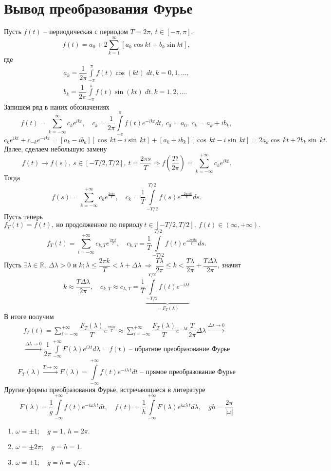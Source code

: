 \section{Вывод преобразования Фурье}
Пусть $f(t)$ -- периодическая с периодом $T=2\pi,\: t\in[-\pi,\pi]$.
$$
f(t)=a_0+2\sum\limits_{k=1}^{\infty}\left[a_k \cos kt + b_k \sin kt\right],
$$
где 
$$
\begin{array}{ll}
a_k=\dfrac{1}{2\pi}\int\limits_{-\pi}^{\pi}f(t)\cos(kt)\;dt, k=0,1,\dots, \\
b_k=\dfrac{1}{2\pi}\int\limits_{-\pi}^{\pi}f(t)\sin(kt)\;dt, k=1,2,\dots.
\end{array}
$$
Запишем ряд в наних обозначениях
$$
f(t)=\sum\limits_{k=-\infty}^{\infty}c_ke^{ikt},\quad c_k=\dfrac{1}{2\pi}\int\limits_{-\pi}^{\pi}f(t)e^{-ikt}dt,\: c_0=a_0,\: c_k=a_k+ib_k,
$$
$$
c_k e^{ikt} + c_{-k} e^{-ikt}=[a_k-ib_k][\cos\,kt + i\sin\,kt] + [a_k+ib_k][\cos\,kt-i\sin\,kt]=2a_k\cos\,kt+2b_k\sin\,kt.
$$
Далее, сделаем небольшую замену
$$
f(t)\longrightarrow f(s),\ s\in[-T/2,T/2],\ t=\dfrac{2\pi s}{T}\Rightarrow f\left(\dfrac{Tt}{2\pi}\right)=\sum\limits_{k=-\infty}^{+\infty}c_k e^{ikt}.
$$
Тогда 
$$
f(s)=\sum\limits_{k=-\infty}^{+\infty}c_k e^{\frac{2\pi is}{T}},\quad c_k=\dfrac{1}{T}\int\limits_{-T/2}^{T/2}f(s)e^{\frac{-2\pi isk}{T}}ds.
$$
Пусть теперь
$$
f_T(t)=f(t),\ \text{но продолженное по периоду}\ t\in\left[-T/2,T/2\right],\ f(t)\in (\infty,+\infty).
$$
$$
f_T(t)=\sum\limits_{i=-\infty}^{+\infty}c_{k,T} e^{\frac{2\pi it}{T}},\quad c_{k,T}=\dfrac{1}{T}\int\limits_{-T/2}^{T/2}f(t)e^{\frac{-2\pi itk}{T}}ds.
$$
Пусть $\exists\lambda\in\mathbb{R},\ \Delta\lambda > 0$  и $k:\lambda\leqslant \dfrac{2\pi k}{T}<\lambda+\Delta\lambda\:\Rightarrow\:\dfrac{T\lambda}{2\pi}\leq k < \dfrac{T\lambda}{2\pi}+\dfrac{T\Delta\lambda}{2\pi}$,  значит 
$$
k\approx \dfrac{T\Delta\lambda}{2\pi},\quad c_{k,T}\approx c_{\lambda,T}=\dfrac{1}{T}\underbrace{\int\limits_{-T/2}^{T/2}f(t)e^{-i\lambda t}}_{=F_T(\lambda)}
$$
В итоге получим
\begin{multline*}
f_T(t)=\sum\limits_{i=-\infty}^{+\infty}\dfrac{F_T(\lambda)}{T}e^{\frac{2\pi ikt}{T}}
\approx\sum\limits_{i=-\infty}^{+\infty}\dfrac{F_T(\lambda)}{T}e^{-\lambda t}\dfrac{T}{2\pi}\Delta\lambda
\xrightarrow{\Delta\lambda\to 0}\\
\xrightarrow{\Delta\lambda\to 0}
\boxed{\dfrac{1}{2\pi}\int\limits_{-\infty}^{+\infty}F(\lambda)e^{i\lambda t}d\lambda=f(t)}\textbf{ -- обратное преобразование Фурье}
\end{multline*}
$$
\boxed{
F_T(\lambda)\xrightarrow{T\to\infty}F(\lambda)=\int\limits_{-\infty}^{+\infty}f(t)e^{-i\lambda\,t}dt}\textbf{ -- прямое преобразование Фурье}
$$
Другие формы преобразования Фурье, встречающиеся в литературе
$$
F(\lambda)=\dfrac{1}{g}\int\limits_{-\infty}^{+\infty}f(t)e^{-i\omega\lambda\,t}dt,\quad 
f(t)=\dfrac{1}{h}\int\limits_{-\infty}^{+\infty}F(\lambda)e^{i\omega\lambda\,t}d\lambda,\quad
gh=\dfrac{2\pi}{|\omega|}
$$
\begin{enumerate}
\item $\omega=\pm 1;\quad g=1,\ h=2\pi.$
\item $\omega=\pm 2\pi;\quad g=h=1.$ 
\item $\omega=\pm 1;\quad g=h=\sqrt{2\pi}.$ 
\end{enumerate}